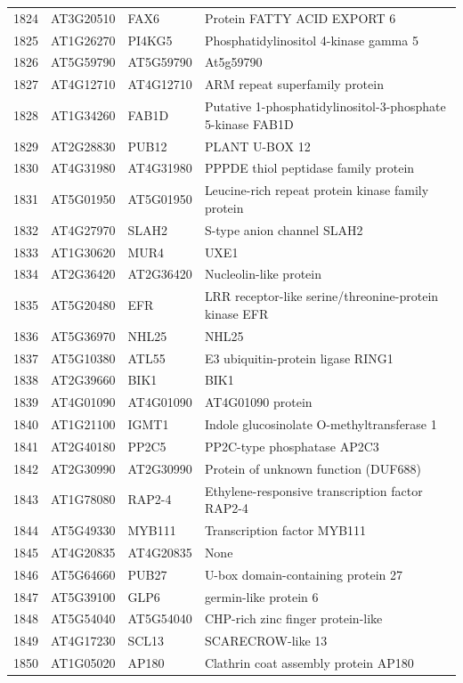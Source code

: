 \documentclass[11pt]{article}
\begin{document}
\begin{center}
\begin{tabular}{rlll}
1824 & AT3G20510 & FAX6 & Protein FATTY ACID EXPORT 6\\
1825 & AT1G26270 & PI4KG5 & Phosphatidylinositol 4-kinase gamma 5\\
1826 & AT5G59790 & AT5G59790 & At5g59790\\
1827 & AT4G12710 & AT4G12710 & ARM repeat superfamily protein\\
1828 & AT1G34260 & FAB1D & Putative 1-phosphatidylinositol-3-phosphate 5-kinase FAB1D\\
1829 & AT2G28830 & PUB12 & PLANT U-BOX 12\\
1830 & AT4G31980 & AT4G31980 & PPPDE thiol peptidase family protein\\
1831 & AT5G01950 & AT5G01950 & Leucine-rich repeat protein kinase family protein\\
1832 & AT4G27970 & SLAH2 & S-type anion channel SLAH2\\
1833 & AT1G30620 & MUR4 & UXE1\\
1834 & AT2G36420 & AT2G36420 & Nucleolin-like protein\\
1835 & AT5G20480 & EFR & LRR receptor-like serine/threonine-protein kinase EFR\\
1836 & AT5G36970 & NHL25 & NHL25\\
1837 & AT5G10380 & ATL55 & E3 ubiquitin-protein ligase RING1\\
1838 & AT2G39660 & BIK1 & BIK1\\
1839 & AT4G01090 & AT4G01090 & AT4G01090 protein\\
1840 & AT1G21100 & IGMT1 & Indole glucosinolate O-methyltransferase 1\\
1841 & AT2G40180 & PP2C5 & PP2C-type phosphatase AP2C3\\
1842 & AT2G30990 & AT2G30990 & Protein of unknown function (DUF688)\\
1843 & AT1G78080 & RAP2-4 & Ethylene-responsive transcription factor RAP2-4\\
1844 & AT5G49330 & MYB111 & Transcription factor MYB111\\
1845 & AT4G20835 & AT4G20835 & None\\
1846 & AT5G64660 & PUB27 & U-box domain-containing protein 27\\
1847 & AT5G39100 & GLP6 & germin-like protein 6\\
1848 & AT5G54040 & AT5G54040 & CHP-rich zinc finger protein-like\\
1849 & AT4G17230 & SCL13 & SCARECROW-like 13\\
1850 & AT1G05020 & AP180 & Clathrin coat assembly protein AP180\\

\end{tabular}
\end{center}
\end{document}
